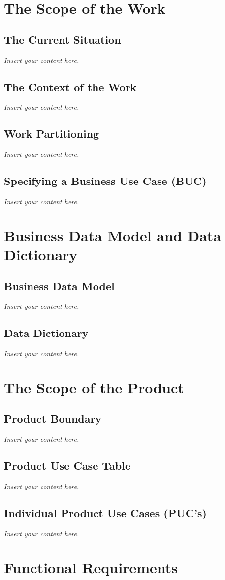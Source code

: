 \documentclass[12pt]{article}
\newcommand{\lips}{\textit{Insert your content here.}}
\begin{document}
\section{The Scope of the Work}
\subsection{The Current Situation}
\lips
\subsection{The Context of the Work}
\lips
\subsection{Work Partitioning}
\lips
\subsection{Specifying a Business Use Case (BUC)}
\lips

\section{Business Data Model and Data Dictionary}
\subsection{Business Data Model}
\lips
\subsection{Data Dictionary}
\lips

\section{The Scope of the Product}
\subsection{Product Boundary}
\lips
\subsection{Product Use Case Table}
\lips
\subsection{Individual Product Use Cases (PUC's)}
\lips

\section{Functional Requirements}
\end{document}
